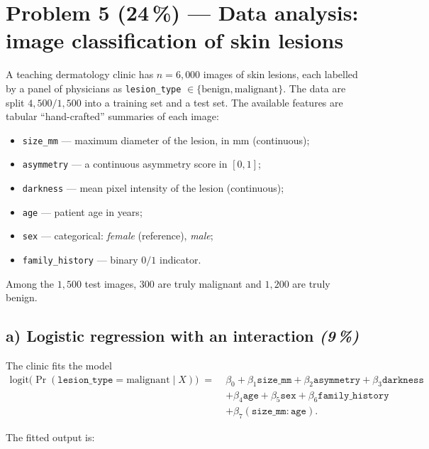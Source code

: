 \documentclass[11pt,a4paper]{article}
\newcommand{\points}[1]{\textbf{(#1\,\%)}}
\newcommand{\subpoints}[1]{\textit{(#1\,\%)}}
\begin{document}
\vfill\eject

\section*{Problem 5 \points{24} --- Data analysis: image classification of skin lesions}

A teaching dermatology clinic has $n = 6{,}000$ images of skin lesions, each labelled by a panel of physicians as \texttt{lesion\_type} $\in \{\text{benign}, \text{malignant}\}$. The data are split $4{,}500 / 1{,}500$ into a training set and a test set. The available features are tabular ``hand-crafted'' summaries of each image:
\begin{itemize}
  \item \texttt{size\_mm} --- maximum diameter of the lesion, in mm (continuous);
  \item \texttt{asymmetry} --- a continuous asymmetry score in $[0, 1]$;
  \item \texttt{darkness} --- mean pixel intensity of the lesion (continuous);
  \item \texttt{age} --- patient age in years;
  \item \texttt{sex} --- categorical: \emph{female} (reference), \emph{male};
  \item \texttt{family\_history} --- binary $0/1$ indicator.
\end{itemize}

Among the $1{,}500$ test images, $300$ are truly malignant and $1{,}200$ are truly benign.

\subsection*{a) Logistic regression with an interaction \subpoints{9}}

The clinic fits the model
\begin{align*}
\text{logit}\bigl(\Pr(\texttt{lesion\_type}=\text{malignant} \mid X)\bigr) \;=\; & \beta_0 + \beta_1 \texttt{size\_mm} + \beta_2 \texttt{asymmetry} + \beta_3 \texttt{darkness} \\
& + \beta_4 \texttt{age} + \beta_5 \texttt{sex} + \beta_6 \texttt{family\_history} \\
& + \beta_7 (\texttt{size\_mm}\!:\!\texttt{age}).
\end{align*}

The fitted output is:
\end{document}
